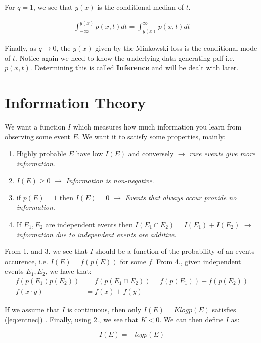 \documentclass[]{article}
\theoremstyle{mattstyle}
\theoremstyle{definition}
\begin{document}
For $q=1$, we see that $y(x)$ is the conditional median of $t$.

\begin{align}
\int_{-\infty}^{y(x)} p(x,t)dt = \int_{y(x)}^{\infty} p(x,t)dt
\end{align}

Finally, as $q \rightarrow 0$, the $y(x)$ given by the Minkowski loss is the conditional mode of $t$. Notice again we need to know the underlying data generating pdf i.e. $p(x, t)$. Determining this is called \textbf{Inference} and will be dealt with later.

\newpage

\section{Information Theory}

We want a function $I$ which measures how much information you learn from observing some event $E$. We want it to satisfy some properties, mainly:

\begin{enumerate}
	\item Highly probable $E$ have low $I(E)$ and conversely $\rightarrow$ \emph{ rare events give more information}.
	\item $I(E) \ge 0$ $\rightarrow$\emph{ Information is non-negative}.
	\item if $p(E)=1$ then $I(E) = 0$ $\rightarrow$\emph{ Events that always occur provide no information}.
	\item If $E_1, E_2$ are independent events then $I(E_1 \cap E_2) = I(E_1) + I(E_2)$ $\rightarrow$\emph{ information due to independent events are additive}.
\end{enumerate}
From 1. and 3. we see that $I$ should be a function of the probability of an events occurence, i.e. $I(E)=f(p(E))$ for some $f$. From 4., given independent events $E_1, E_2$, we have that:
\begin{align}\label{eq:entnec}
f(p(E_1)p(E_2)) &= f(p(E_1\cap E_2)) = f(p(E_1)) + f(p(E_2))\\
f(x\cdot y) &= f(x) + f(y)
\end{align}

If we assume that $I$ is continuous, then only $I(E) = Klog p(E)$ satisfies (\ref{eq:entnec})  \cite{EntNotes}. Finally, using 2., we see that $K<0$. We can then define $I$ as:

\begin{equation}
I(E) = -log p(E)
\end{equation}
\end{document}

